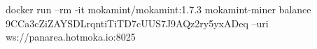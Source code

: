 \begin{shellcommandbox}\begin{ttlst}
docker run --rm -it mokamint/mokamint:1.7.3 mokamint-miner balance 9CCa3cZiZAYSDLrqntiTiTD7cUUS7J9AQz2ry5yxADeq --uri ws://panarea.hotmoka.io:8025
\end{ttlst}\end{shellcommandbox}
